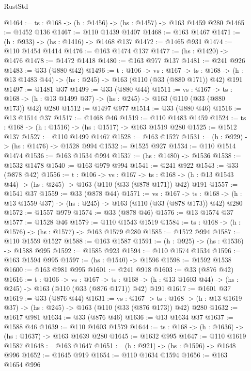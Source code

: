 \begin{lexlean}{RustStd}
\begin{coremodule}
{\begin{coremodule}
{{{@1464 := {ts : @168} -> (h : @1456) -> (hs : @1457) -> @163 @1459 @280
@1465 := @1452 @136
@1467 := @110 @1439 @1407
@1468 := @163 @1467
@1471 := (h : @933) -> (hs : @1416) -> @1468 @137
@1472 := @1465 @931
@1474 := @110 @1454 @1414
@1476 := @163 @1474 @137
@1477 := (hs : @1420) -> @1476
@1478 := @1472 @1418
@1480 := @163 @977 @137
@1481 := @241 @926
@1483 := @33 (@880 @42)
@1496 := {t : @106} ->
  {vs : @167} ->
  {ts : @168} -> (h : @13 @1483 @44) -> (hs : @245) -> @163 (@110 (@33 (@880 @171)) @42) @191
@1497 := @1481 @37
@1499 := @33 (@880 @44)
@1511 := {vs : @167} ->
  {ts : @168} -> (h : @13 @1499 @37) -> (hs : @245) -> @163 (@110 (@33 (@880 @173)) @42) @280
@1512 := @1497 @977
@1514 := @33 (@880 @46)
@1516 := @13 @1514 @37
@1517 := @1468 @46
@1519 := @110 @1483 @1459
@1524 := {ts : @168} -> (h : @1516) -> (hs : @1517) -> @163 @1519 @280
@1525 := @1512 @137
@1527 := @110 @1499 @1467
@1528 := @163 @1527
@1531 := (h : @929) -> (hs : @1476) -> @1528 @994
@1532 := @1525 @927
@1534 := @110 @1514 @1474
@1536 := @163 @1534 @994
@1537 := (hs : @1480) -> @1536
@1538 := @1532 @1478
@1540 := @163 @979 @994
@1541 := @241 @922
@1543 := @33 (@878 @42)
@1556 := {t : @106} ->
  {vs : @167} ->
  {ts : @168} -> (h : @13 @1543 @44) -> (hs : @245) -> @163 (@110 (@33 (@878 @171)) @42) @191
@1557 := @1541 @37
@1559 := @33 (@878 @44)
@1571 := {vs : @167} ->
  {ts : @168} -> (h : @13 @1559 @37) -> (hs : @245) -> @163 (@110 (@33 (@878 @173)) @42) @280
@1572 := @1557 @979
@1574 := @33 (@878 @46)
@1576 := @13 @1574 @37
@1577 := @1528 @46
@1579 := @110 @1543 @1519
@1584 := {ts : @168} -> (h : @1576) -> (hs : @1577) -> @163 @1579 @280
@1585 := @1572 @994
@1587 := @110 @1559 @1527
@1588 := @163 @1587
@1591 := (h : @925) -> (hs : @1536) -> @1588 @995
@1592 := @1585 @923
@1594 := @110 @1574 @1534
@1596 := @163 @1594 @995
@1597 := (hs : @1540) -> @1596
@1598 := @1592 @1538
@1600 := @163 @981 @995
@1601 := @241 @918
@1603 := @33 (@876 @42)
@1616 := {t : @106} ->
  {vs : @167} ->
  {ts : @168} -> (h : @13 @1603 @44) -> (hs : @245) -> @163 (@110 (@33 (@876 @171)) @42) @191
@1617 := @1601 @37
@1619 := @33 (@876 @44)
@1631 := {vs : @167} ->
  {ts : @168} -> (h : @13 @1619 @37) -> (hs : @245) -> @163 (@110 (@33 (@876 @173)) @42) @280
@1632 := @1617 @981
@1634 := @33 (@876 @46)
@1636 := @13 @1634 @37
@1637 := @1588 @46
@1639 := @110 @1603 @1579
@1644 := {ts : @168} -> (h : @1636) -> (hs : @1637) -> @163 @1639 @280
@1645 := @1632 @995
@1647 := @110 @1619 @1587
@1648 := @163 @1647
@1651 := (h : @921) -> (hs : @1596) -> @1648 @996
@1652 := @1645 @919
@1654 := @110 @1634 @1594
@1656 := @163 @1654 @996
}}}
\end{coremodule}}
\end{coremodule}
\end{lexlean}

